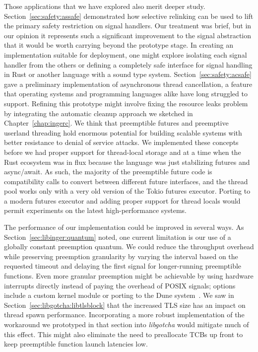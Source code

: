 Those applications that we have explored also merit deeper study.
Section~\ref{sec:safety:assafe} demonstrated how selective relinking can be used to
lift the primary safety restriction on signal handlers.  Our treatment was brief, but
in our opinion it represents such a significant improvement to the signal abstraction
that it would be worth carrying beyond the prototype stage.  In creating an
implementation suitable for deployment, one might explore isolating each signal
handler from the others or defining a completely safe interface for signal handling
in Rust or another language with a sound type system.
Section~\ref{sec:safety:acsafe} gave a preliminary implementation of asynchronous
thread cancellation, a feature that operating systems and programming languages alike
have long struggled to support.  Refining this prototype might involve fixing the
resource leaks problem by integrating the automatic cleanup approach we sketched in
Chapter~\ref{chap:ingerc}.
We think that preemptible futures and preemptive userland threading hold enormous
potential for building scalable systems with better resistance to denial of service
attacks.  We implemented these concepts before we had proper support for thread-local
storage and at a time when the Rust ecosystem was in flux because the language was
just stabilizing futures and async/await.  As such, the majority of the preemptible
future code is compatibility calls to convert between different future interfaces,
and the thread pool works only with a very old version of the Tokio futures executor.
Porting to a modern futures executor and adding proper support for thread locals
would permit experiments on the latest high-performance systems.

The performance of our implementation could be improved in several ways.  As
Section~\ref{sec:libinger:quantum} noted, one current limitation is our use of a
globally constant preemption quantum.  We could reduce the throughput overhead while
preserving preemption granularity by varying the interval based on the requested
timeout and delaying the first signal for longer-running preemptible functions.  Even
more granular preemption might be achievable by using hardware interrupts directly
instead of paying the overhead of POSIX signals; options include a custom kernel
module or porting to the Dune system~\cite{Belay:osdi2012}.  We saw in
Section~\ref{sec:libgotcha:libtlsblock} that the increased TLS size has an impact on
thread spawn performance.  Incorporating a more robust implementation of the
workaround we prototyped in that section into \textit{libgotcha} would mitigate much
of this effect.  This might also eliminate the need to preallocate TCBs up front to
keep preemptible function launch latencies low.

